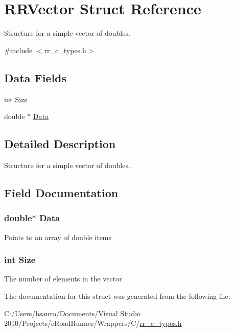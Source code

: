 \hypertarget{struct_r_r_vector}{
\section{\-R\-R\-Vector \-Struct \-Reference}
\label{struct_r_r_vector}
}


\-Structure for a simple vector of doubles.  




{\ttfamily \#include $<$rr\-\_\-c\-\_\-types.\-h$>$}

\subsection*{\-Data \-Fields}
\begin{DoxyCompactItemize}
\item 
int \hyperlink{struct_r_r_vector_af06eb7b9b70be91dadd4f12ebcaed796}{\-Size}
\item 
double $\ast$ \hyperlink{struct_r_r_vector_a7c5cbda3aa940f4b0d6e8a1679307dfc}{\-Data}
\end{DoxyCompactItemize}


\subsection{\-Detailed \-Description}
\-Structure for a simple vector of doubles. 

\subsection{\-Field \-Documentation}
\hypertarget{struct_r_r_vector_a7c5cbda3aa940f4b0d6e8a1679307dfc}{
\subsubsection[{\-Data}]{\setlength{\rightskip}{0pt plus 5cm}double$\ast$ {\bf \-Data}}}
\label{struct_r_r_vector_a7c5cbda3aa940f4b0d6e8a1679307dfc}
\-Points to an array of double items \hypertarget{struct_r_r_vector_af06eb7b9b70be91dadd4f12ebcaed796}{
\subsubsection[{\-Size}]{\setlength{\rightskip}{0pt plus 5cm}int {\bf \-Size}}}
\label{struct_r_r_vector_af06eb7b9b70be91dadd4f12ebcaed796}
\-The number of elements in the vector 

\-The documentation for this struct was generated from the following file\-:\begin{DoxyCompactItemize}
\item 
\-C\-:/\-Users/hsauro/\-Documents/\-Visual Studio 2010/\-Projects/c\-Road\-Runner/\-Wrappers/\-C/\hyperlink{rr__c__types_8h}{rr\-\_\-c\-\_\-types.\-h}\end{DoxyCompactItemize}
